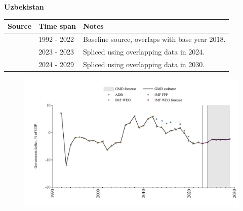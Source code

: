 \documentclass[12pt,a4paper,landscape]{article}
\begin{document}
\begin{adjustbox}{max totalsize={\paperwidth}{\paperheight},center}
\begin{minipage}[t][\textheight][t]{\textwidth}
\vspace*{0.5cm}
{}
\begin{center}
{\Large\bfseries Uzbekistan}
\end{center}
\vspace{0.5cm}
\begin{table}[H]
\centering
\small
\begin{tabular}{|l|l|l|}
\hline
\textbf{Source} & \textbf{Time span} & \textbf{Notes} \\
\hline
\rowcolor{white}\cite{IMF_WEO}& 1992 - 2022 &Baseline source, overlaps with base year 2018.\\
\rowcolor{lightgray}\cite{IMF_FPP}& 2023 - 2023 &Spliced using overlapping data in 2024.\\
\rowcolor{white}\cite{IMF_WEO_forecast}& 2024 - 2029 &Spliced using overlapping data in 2030.\\
\hline
\end{tabular}
\end{table}
\begin{figure}[H]
\centering
\includegraphics[width=\textwidth,height=0.6\textheight,keepaspectratio]{graphs/UZB_govdef_GDP.pdf}
\end{figure}
\end{minipage}
\end{adjustbox}
\end{document}
